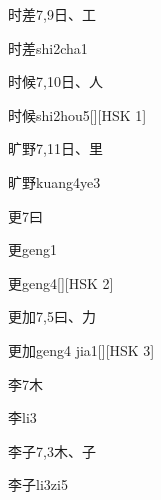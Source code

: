 \begin{entry}{时差}{7,9}{⽇、⼯}
  \begin{phonetics}{时差}{shi2cha1}
  \end{phonetics}
\end{entry}

\begin{entry}{时候}{7,10}{⽇、⼈}
  \begin{phonetics}{时候}{shi2hou5}[][HSK 1]
  \end{phonetics}
\end{entry}

\begin{entry}{旷野}{7,11}{⽇、⾥}
  \begin{phonetics}{旷野}{kuang4ye3}
  \end{phonetics}
\end{entry}

\begin{entry}{更}{7}{⽈}
  \begin{phonetics}{更}{geng1}
  \end{phonetics}
  \begin{phonetics}{更}{geng4}[][HSK 2]
  \end{phonetics}
\end{entry}

\begin{entry}{更加}{7,5}{⽈、⼒}
  \begin{phonetics}{更加}{geng4 jia1}[][HSK 3]
  \end{phonetics}
\end{entry}

\begin{entry}{李}{7}{⽊}
  \begin{phonetics}{李}{li3}
  \end{phonetics}
\end{entry}

\begin{entry}{李子}{7,3}{⽊、⼦}
  \begin{phonetics}{李子}{li3zi5}
  \end{phonetics}
\end{entry}

